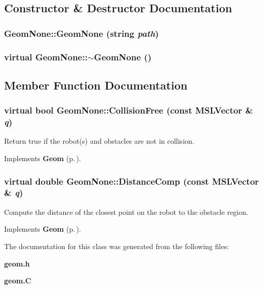 \subsection{Constructor \& Destructor Documentation}
\subsubsection{\setlength{\rightskip}{0pt plus 5cm}Geom\-None::Geom\-None (string {\em path})}\label{classGeomNone_a0}


\subsubsection{\setlength{\rightskip}{0pt plus 5cm}virtual Geom\-None::$\sim$Geom\-None ()\hspace{0.3cm}{\tt  [inline, virtual]}}\label{classGeomNone_a1}




\subsection{Member Function Documentation}
\subsubsection{\setlength{\rightskip}{0pt plus 5cm}virtual bool Geom\-None::Collision\-Free (const {\bf MSLVector} \& {\em q})\hspace{0.3cm}{\tt  [inline, virtual]}}\label{classGeomNone_a2}


Return true if the robot(s) and obstacles are not in collision.



Implements {\bf Geom} {\rm (p.\,\pageref{classGeom_a2})}.
\subsubsection{\setlength{\rightskip}{0pt plus 5cm}virtual double Geom\-None::Distance\-Comp (const {\bf MSLVector} \& {\em q})\hspace{0.3cm}{\tt  [inline, virtual]}}\label{classGeomNone_a3}


Compute the distance of the closest point on the robot to the obstacle region.



Implements {\bf Geom} {\rm (p.\,\pageref{classGeom_a3})}.

The documentation for this class was generated from the following files:\begin{CompactItemize}
\item 
{\bf geom.h}\item 
{\bf geom.C}\end{CompactItemize}
